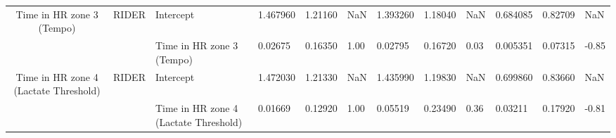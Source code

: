 \begin{tabular}{c}
Time in HR zone 3 (Tempo) & RIDER & Intercept &  1.467960 &  1.21160 &   NaN &  1.393260 &  1.18040 &   NaN &  0.684085 &  0.82709 &   NaN \\
                                      &       & Time in HR zone 3 (Tempo) &   0.02675 &  0.16350 &  1.00 &   0.02795 &  0.16720 &  0.03 &  0.005351 &  0.07315 & -0.85 \\
Time in HR zone 4 (Lactate Threshold) & RIDER & Intercept &  1.472030 &  1.21330 &   NaN &  1.435990 &  1.19830 &   NaN &  0.699860 &  0.83660 &   NaN \\
                                      &       & Time in HR zone 4 (Lactate Threshold) &   0.01669 &  0.12920 &  1.00 &   0.05519 &  0.23490 &  0.36 &   0.03211 &  0.17920 & -0.81 \\
\bottomrule
\end{tabular}
